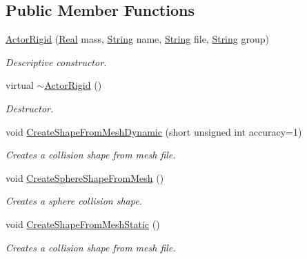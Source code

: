 \subsection*{Public Member Functions}
\begin{DoxyCompactItemize}
\item 
\hyperlink{classphys_1_1ActorRigid_abc5fd9a4ef92dddc4c640b6642994da1}{ActorRigid} (\hyperlink{namespacephys_af7eb897198d265b8e868f45240230d5f}{Real} mass, \hyperlink{namespacephys_aa03900411993de7fbfec4789bc1d392e}{String} name, \hyperlink{namespacephys_aa03900411993de7fbfec4789bc1d392e}{String} file, \hyperlink{namespacephys_aa03900411993de7fbfec4789bc1d392e}{String} group)
\begin{DoxyCompactList}\small\item\em Descriptive constructor. \item\end{DoxyCompactList}\item 
virtual \hyperlink{classphys_1_1ActorRigid_ab317b5a2578157e54655a1aea8f4d058}{$\sim$ActorRigid} ()
\begin{DoxyCompactList}\small\item\em Destructor. \item\end{DoxyCompactList}\item 
void \hyperlink{classphys_1_1ActorRigid_aab4a408ce0724be6adf4c9f51f55f8a1}{CreateShapeFromMeshDynamic} (short unsigned int accuracy=1)
\begin{DoxyCompactList}\small\item\em Creates a collision shape from mesh file. \item\end{DoxyCompactList}\item 
void \hyperlink{classphys_1_1ActorRigid_ae401c116a07ee4ed3fc677e83308fba5}{CreateSphereShapeFromMesh} ()
\begin{DoxyCompactList}\small\item\em Creates a sphere collision shape. \item\end{DoxyCompactList}\item 
void \hyperlink{classphys_1_1ActorRigid_a84554dcaaf2475ba0ec7dcb9235050ac}{CreateShapeFromMeshStatic} ()
\begin{DoxyCompactList}\small\item\em Creates a collision shape from mesh file. \item\end{DoxyCompactList}\item 

\end{DoxyCompactItemize}
